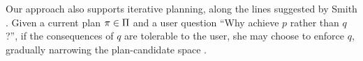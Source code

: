Our approach also supports iterative planning, along the lines
suggested by Smith . Given a current plan
$\pi \in \Pi$ and a user question ``Why achieve $p$ rather than
$q$?'', if the consequences of $q$ are tolerable to the user, she may
choose to enforce $q$, gradually narrowing the plan-candidate space
\plans.
%
%

